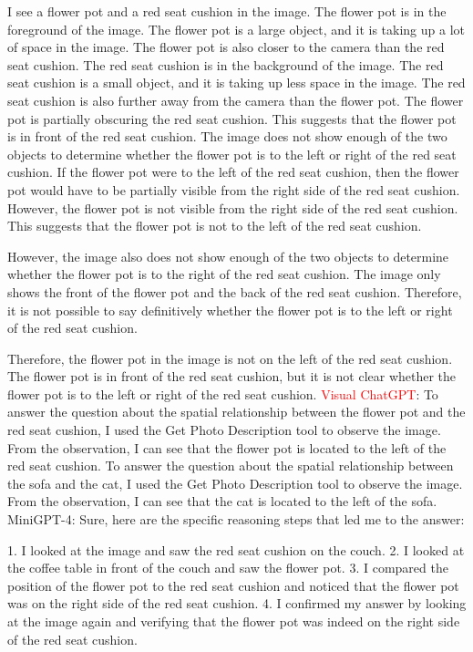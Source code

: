 \begin{enumerate}
    I see a flower pot and a red seat cushion in the image.
    The flower pot is in the foreground of the image. The flower pot is a large object, and it is taking up a lot of space in the image. The flower pot is also closer to the camera than the red seat cushion.
    The red seat cushion is in the background of the image. The red seat cushion is a small object, and it is taking up less space in the image. The red seat cushion is also further away from the camera than the flower pot.
    The flower pot is partially obscuring the red seat cushion. This suggests that the flower pot is in front of the red seat cushion.
    The image does not show enough of the two objects to determine whether the flower pot is to the left or right of the red seat cushion.
    If the flower pot were to the left of the red seat cushion, then the flower pot would have to be partially visible from the right side of the red seat cushion. However, the flower pot is not visible from the right side of the red seat cushion. This suggests that the flower pot is not to the left of the red seat cushion.
    
    However, the image also does not show enough of the two objects to determine whether the flower pot is to the right of the red seat cushion. The image only shows the front of the flower pot and the back of the red seat cushion. Therefore, it is not possible to say definitively whether the flower pot is to the left or right of the red seat cushion.
    
    Therefore, the flower pot in the image is not on the left of the red seat cushion. The flower pot is in front of the red seat cushion, but it is not clear whether the flower pot is to the left or right of the red seat cushion.
    \subitem \textcolor{red}{Visual ChatGPT}: To answer the question about the spatial relationship between the flower pot and the red seat cushion, I used the Get Photo Description tool to observe the image. From the observation, I can see that the flower pot is located to the left of the red seat cushion. To answer the question about the spatial relationship between the sofa and the cat, I used the Get Photo Description tool to observe the image. From the observation, I can see that the cat is located to the left of the sofa.
    \subitem MiniGPT-4: Sure, here are the specific reasoning steps that led me to the answer:

    1. I looked at the image and saw the red seat cushion on the couch.
    2. I looked at the coffee table in front of the couch and saw the flower pot.
    3. I compared the position of the flower pot to the red seat cushion and noticed that the flower pot was on the right side of the red seat cushion.
    4. I confirmed my answer by looking at the image again and verifying that the flower pot was indeed on the right side of the red seat cushion.
\end{enumerate}
